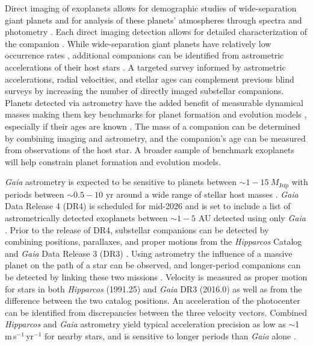 Direct imaging of exoplanets allows for demographic studies of wide-separation giant planets and for analysis of these planets' atmospheres through spectra and photometry . Each direct imaging detection allows for detailed characterization of the companion . While wide-separation giant planets have relatively low occurrence rates , additional companions can be identified from astrometric accelerations of their host stars . A targeted survey informed by astrometric accelerations, radial velocities, and stellar ages can complement previous blind surveys by increasing the number of directly imaged substellar companions. Planets detected via astrometry have the added benefit of measurable dynamical masses making them key benchmarks for planet formation and evolution models , especially if their ages are known . The mass of a companion can be determined by combining imaging and astrometry, and the companion's age can be measured from observations of the host star. A broader sample of benchmark exoplanets will help constrain planet formation and evolution models.
	
 \textit{Gaia} astrometry is expected to be sensitive to planets between $\sim1-15 \ M_\textrm{Jup}$ with periods between $\sim0.5-10 $ yr around a wide range of stellar host masses \citep{2014ApJ...797...14P}. \textit{Gaia} Data Release 4 (DR4) is scheduled for mid-2026 and is set to include a list of astrometrically detected exoplanets between $\sim1-5$ AU  detected using only \textit{Gaia} \citep{2016A&A...595A...1G}.
 Prior to the release of DR4, substellar companions can be detected by combining positions, parallaxes, and proper motions from the \textit{Hipparcos} Catalog \citep{1997A&A...323L..49P, 1997A&A...323L..61V} and \textit{Gaia} Data Release 3 (DR3) \citep{2023A&A...674A...1G}. Using astrometry the influence of a massive planet on the path of a star can be observed, and longer-period companions can be detected by linking these two missions . Velocity is measured as proper motion for stars in both \textit{Hipparcos} (1991.25) and \textit{Gaia} DR3 (2016.0) as well as from the difference between the two catalog positions. An acceleration of the photocenter can be identified from discrepancies between the three velocity vectors. Combined \textit{Hipparcos} and \textit{Gaia} astrometry yield typical acceleration precision as low as $\sim$1\,m\,s$^{-1}$\,yr$^{-1}$ for nearby stars, and is sensitive to longer periods than \textit{Gaia} alone \citep{2021ApJS..254...42B}. 

